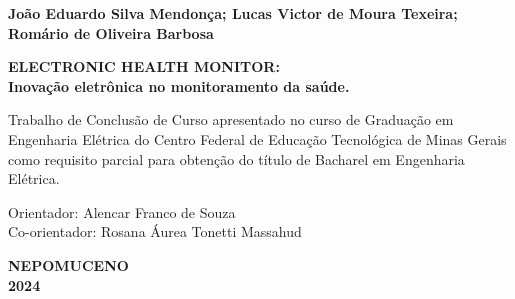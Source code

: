 \thispagestyle{empty}

\begin{center}

{\large \textbf{João Eduardo Silva Mendonça; Lucas Victor de Moura Texeira; Romário de Oliveira Barbosa}}

\vspace{6cm}

{\large \textbf{ELECTRONIC HEALTH MONITOR: \\ \vspace{0.5 cm} Inovação eletrônica no monitoramento da saúde.}} \\
\vspace{0.7 cm}
\end{center}

\hspace{6.5cm}\begin{minipage}{8 cm}
     \nohyphens{Trabalho de Conclusão de Curso apresentado no curso de Graduação em Engenharia Elétrica do Centro Federal de Educação Tecnológica de Minas Gerais como requisito parcial para obtenção do título de Bacharel em Engenharia Elétrica.}

    \vspace{0.6 cm}

    Orientador: Alencar Franco de Souza \\
    Co-orientador: Rosana Áurea Tonetti Massahud
\end{minipage}
\vspace{3 cm}


\vspace{3cm}
\begin{center}
{\large \textbf{NEPOMUCENO}} \\
{\large \textbf{2024}}
\end{center}
